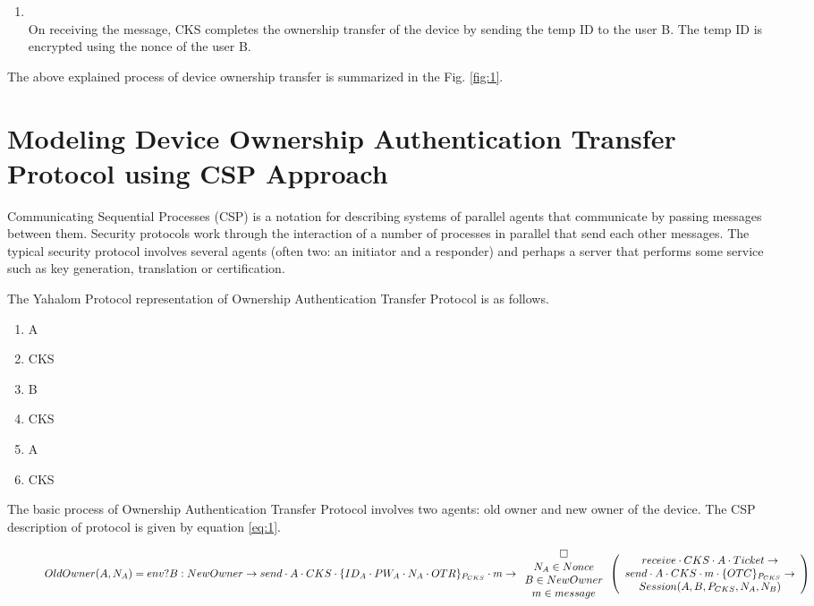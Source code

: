 \documentclass[letterpaper]{article}
\begin{document}
\begin{enumerate}
				\item \\ 
				On receiving the message, CKS completes the ownership transfer of the device by sending the temp ID  to the user B. The temp ID is encrypted using the nonce of the user B. 
								
			\end{enumerate}
			
				The above explained process of device ownership transfer is summarized in the Fig. \ref{fig:1}.
				

\section{Modeling Device Ownership Authentication Transfer Protocol using CSP Approach}
\label{b}

Communicating Sequential Processes (CSP) \cite{masp1}\cite{masp2} is a notation for describing systems of parallel agents that communicate by passing messages between them. Security protocols work through the interaction of a number of processes in parallel that send each other messages. The typical security protocol involves several agents (often two: an initiator and a responder) and perhaps a server that performs some service such as key generation, translation or certification. 

The Yahalom Protocol \cite{yp} representation of Ownership Authentication Transfer Protocol is as follows.
\begin{enumerate}[M1]
\item A  
\item CKS 
\item B  
\item CKS  
\item A  
\item CKS  
\end{enumerate}

The basic process of Ownership Authentication Transfer Protocol involves two agents: old owner and new owner of the device. The CSP description of protocol is given by equation \eqref{eq:1}.
\begin{figure*}[bpht!]
\begin{dmath}\label{eq:1}
OldOwner(A,N_{A})=env?B:NewOwner \rightarrow send \cdot A \cdot CKS \cdot \{ID_{A}\cdot PW_{A} \cdot N_{A} \cdot OTR\}_{P_{CKS}} \cdot m \rightarrow \\
\begin{array}{c} \square \\N_{A} \in Nonce \\ B \in NewOwner \\ m \in  message \end{array} \left(\begin{array}{c} receive \cdot CKS \cdot A \cdot Ticket \rightarrow \\ send \cdot A \cdot CKS \cdot m \cdot \{OTC\}_{P_{CKS}} \rightarrow \\ 
Session(A,B,P_{CKS},N_{A},N_{B})\end{array} \right)
\end{dmath}
\end{figure*}
\end{document}
